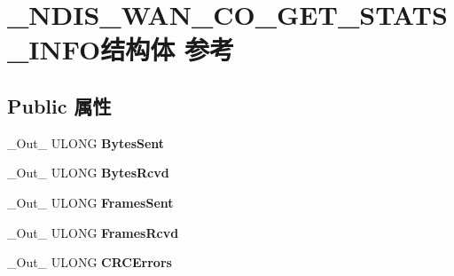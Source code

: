 \hypertarget{struct___n_d_i_s___w_a_n___c_o___g_e_t___s_t_a_t_s___i_n_f_o}{}\section{\+\_\+\+N\+D\+I\+S\+\_\+\+W\+A\+N\+\_\+\+C\+O\+\_\+\+G\+E\+T\+\_\+\+S\+T\+A\+T\+S\+\_\+\+I\+N\+F\+O结构体 参考}
\label{struct___n_d_i_s___w_a_n___c_o___g_e_t___s_t_a_t_s___i_n_f_o}
\subsection*{Public 属性}
\begin{DoxyCompactItemize}
\item 
\mbox{\label{struct___n_d_i_s___w_a_n___c_o___g_e_t___s_t_a_t_s___i_n_f_o_a67bfc05391829b75e53e98238d655b98}} 
\+\_\+\+Out\+\_\+ U\+L\+O\+NG {\bfseries Bytes\+Sent}
\item 
\mbox{\label{struct___n_d_i_s___w_a_n___c_o___g_e_t___s_t_a_t_s___i_n_f_o_a12d5579f7e56bd47bc6978dac4d57a9d}} 
\+\_\+\+Out\+\_\+ U\+L\+O\+NG {\bfseries Bytes\+Rcvd}
\item 
\mbox{\label{struct___n_d_i_s___w_a_n___c_o___g_e_t___s_t_a_t_s___i_n_f_o_a256dc2f4c260e558935484169ab6c89a}} 
\+\_\+\+Out\+\_\+ U\+L\+O\+NG {\bfseries Frames\+Sent}
\item 
\mbox{\label{struct___n_d_i_s___w_a_n___c_o___g_e_t___s_t_a_t_s___i_n_f_o_a34a230996a9a5936a1f388e89d72c4c9}} 
\+\_\+\+Out\+\_\+ U\+L\+O\+NG {\bfseries Frames\+Rcvd}
\item 
\mbox{\label{struct___n_d_i_s___w_a_n___c_o___g_e_t___s_t_a_t_s___i_n_f_o_adc2d829c58bceb8b4d22d14aeb56657d}} 
\+\_\+\+Out\+\_\+ U\+L\+O\+NG {\bfseries C\+R\+C\+Errors}
\item 
\mbox{\label{struct___n_d_i_s___w_a_n___c_o___g_e_t___s_t_a_t_s___i_n_f_o_a1bd928f3697d764e674fe72ead263aec}} 

\end{DoxyCompactItemize}
